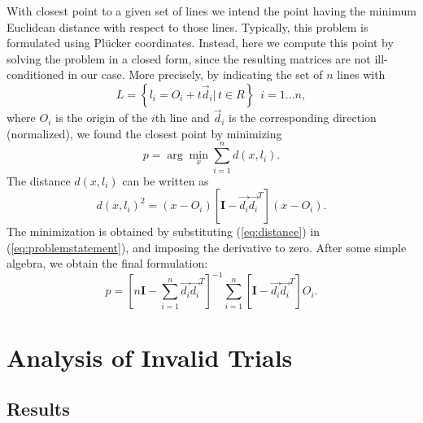 \documentclass[prodmode,hillsideplop]{../acmlarge}
\begin{document}
With closest point to a given set of lines we intend the point
having the minimum Euclidean distance with respect to those lines.
Typically, this problem is formulated using Pl\"{u}cker coordinates.
Instead, here we compute this point by solving the problem in a closed
form, since the resulting matrices are not ill-conditioned in our
case. More precisely, by indicating the set of $n$ lines with
%
\begin{equation}
  L = \left \{ l_i = O_i + t \vec{d}_i | \, t \in {R} \right \} \,\,\, i = 1
  \ldots n,
  \label{eq:setoflines}
\end{equation}
%
where $O_i$ is the origin of the $i$th line and $\vec{d}_i$ is the
corresponding direction (normalized), we found the closest point by
minimizing
%
\begin{equation}
  p = \arg \min_{x} \sum_{i=1}^{n} d(x,l_i).
  \label{eq:problemstatement}
\end{equation}
%
The distance $d(x, l_i)$ can be written as
%
\begin{equation}
  d(x , l_i)^2 = (x - O_i) \left [ \textbf{I} - \vec{d_i} \vec{d_i}^T \right ] (x - O_i).
  \label{eq:distance}
\end{equation}
%
The minimization is obtained by substituting (\ref{eq:distance}) in
(\ref{eq:problemstatement}), and imposing the derivative to zero.
%
After some simple algebra, we obtain the final formulation:
%
\begin{equation}
  p = \left [ n \textbf{I} - \sum_{i=1}^{n} \vec{d_i} \vec{d_i}^T
  \right ]^{-1} \sum_{i=1}^{n} \left [ \textbf{I} - \vec{d_i} \vec{d_i}^T \right ] O_i.
  \label{eq:closedform}
\end{equation}





\elecappendix


\section{Analysis of Invalid Trials}
\label{invalid}

\subsection{Results}
\end{document}
